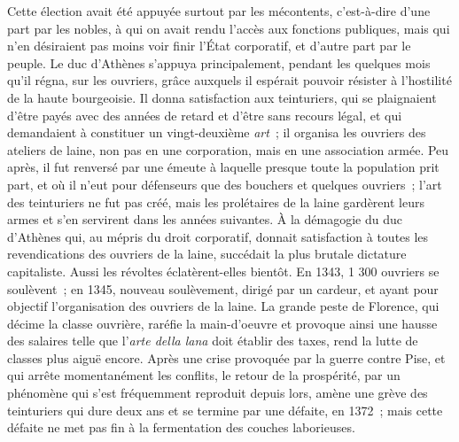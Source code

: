 \documentclass[french,twoside]{book} %
\begin{document}
Cette élection avait été appuyée surtout par les mécontents, c'est-à-dire d'une part par les nobles, à qui on avait rendu l'accès aux fonctions publiques, mais qui n'en désiraient pas moins voir finir l'État corporatif, et d'autre part par le peuple. Le duc d'Athènes s'appuya principalement, pendant les quelques mois qu'il régna, sur les ouvriers, grâce auxquels il espérait pouvoir résister à l'hostilité de la haute bourgeoisie. Il donna satisfaction aux teinturiers, qui se plaignaient d'être payés avec des années de retard et d'être sans recours légal, et qui demandaient à constituer un vingt-deuxième {\itshape art} ; il organisa les ouvriers des ateliers de laine, non pas en une corporation, mais en une asso­ciation armée. Peu après, il fut renversé par une émeute à laquelle presque toute la population prit part, et où il n'eut pour défenseurs que des bouchers et quelques ouvriers ; l'art des teinturiers ne fut pas créé, mais les prolétaires de la laine gardèrent leurs armes et s'en servirent dans les années suivantes. À la démagogie du duc d'Athènes qui, au mépris du droit corporatif, donnait satisfaction à toutes les revendications des ouvriers de la laine, succédait la plus brutale dictature capitaliste. Aussi les révoltes éclatèrent-elles bientôt. En 1343, 1 300 ouvriers se soulèvent ; en 1345, nouveau soulèvement, dirigé par un cardeur, et ayant pour objectif l'organisation des ouvriers de la laine. La grande peste de Florence, qui décime la classe ouvrière, raréfie la main-d'oeuvre et provoque ainsi une hausse des salaires telle que l’{\itshape arte della lana} doit établir des taxes, rend la lutte de classes plus aiguë encore. Après une crise provoquée par la guerre contre Pise, et qui arrête momentanément les conflits, le retour de la prospérité, par un phénomène qui s'est fréquemment reproduit depuis lors, amène une grève des teinturiers qui dure deux ans et se termine par une défaite, en 1372 ; mais cette défaite ne met pas fin à la fermentation des couches laborieuses.\par
\end{document}
